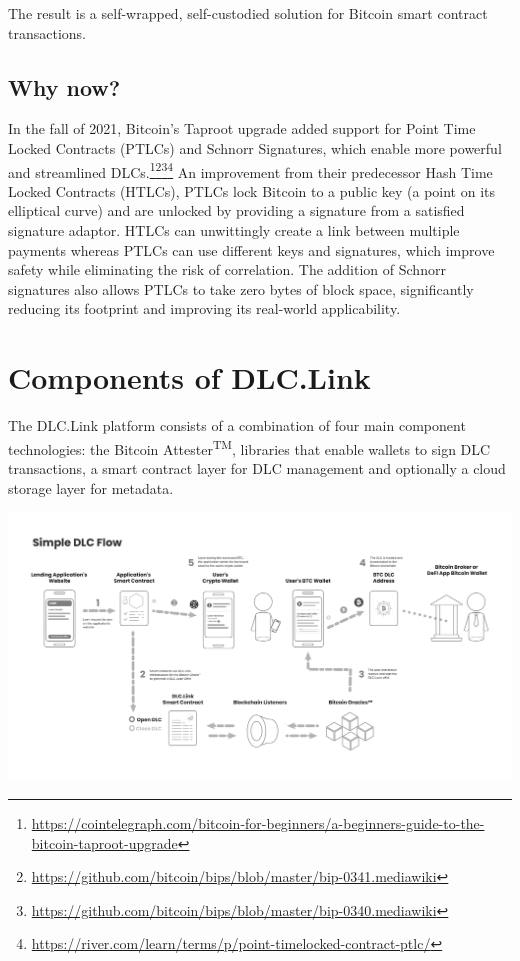 \documentclass[twoside, a4paper, 11pt]{article}
\begin{document}
  The result is a self-wrapped, self-custodied solution for Bitcoin smart contract transactions.

  \subsection{Why now?}
  In the fall of 2021, Bitcoin’s Taproot upgrade added support for Point Time Locked Contracts (PTLCs) and Schnorr Signatures, which enable more powerful and streamlined DLCs.\footnote{\url{https://cointelegraph.com/bitcoin-for-beginners/a-beginners-guide-to-the-bitcoin-taproot-upgrade}}\footnote{\url{https://github.com/bitcoin/bips/blob/master/bip-0341.mediawiki}}\footnote{\url{https://github.com/bitcoin/bips/blob/master/bip-0340.mediawiki}}\footnote{\url{https://river.com/learn/terms/p/point-timelocked-contract-ptlc/}} An improvement from their predecessor Hash Time Locked Contracts (HTLCs), PTLCs lock Bitcoin to a public key (a point on its elliptical curve) and are unlocked by providing a signature from a satisfied signature adaptor. HTLCs can unwittingly create a link between multiple payments whereas PTLCs can use different keys and signatures, which improve safety while eliminating the risk of correlation. The addition of Schnorr signatures also allows PTLCs to take zero bytes of block space, significantly reducing its footprint and improving its real-world applicability.

  \section{Components of DLC.Link}

  The DLC.Link platform consists of a combination of four main component technologies: the Bitcoin Attester\textsuperscript{TM}, libraries that enable wallets to sign DLC transactions, a smart contract layer for DLC management and optionally a cloud storage layer for metadata.
  \begin{center}
    \includegraphics[width=\textwidth]{components}
  \end{center}
\end{document}
